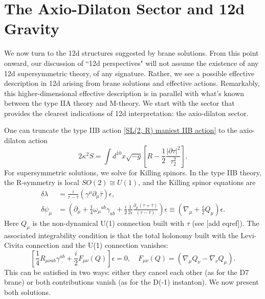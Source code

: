 \section{The Axio-Dilaton Sector and 12d Gravity}
We now turn to the 12d structures suggested by brane solutions.
From this point onward, our discussion of ``12d perspectives" will not assume the existence of any 12d supersymmetric theory, of any signature.
Rather, we see a possible effective description in 12d arising from brane solutions and effective actions.
Remarkably, this higher-dimensional effective description is in parallel with what's known between the type IIA theory and M-theory.
We start with the sector that provides the clearest indications of 12d interpretation: the axio-dilaton sector.

One can truncate the type IIB action \eqref{SL(2, R) maniest IIB action} to the axio-dilaton action
\begin{equation}
2\kappa^2S=
\int d^{10}x\sqrt{-g}\left[
R-\frac{1}{2}\frac{|\partial \tau|^2}{\tau_2^2}
\right].
\label{IIB axio-dilaton action}
\end{equation}
For supersymmetric solutions, we solve for Killing spinors.
In the type IIB theory, the R-symmetry is local $SO(2)\cong U(1)$, and the Killing spinor equations are \cite{Bergshoeff:2006jj}
\begin{equation}
\begin{aligned}
\delta\lambda
&=\frac{i}{\tau-\bar\tau}(\gamma^\mu\partial_\mu \bar\tau)\epsilon,\\
\delta\psi_\mu
&=
\left(
\partial_\mu+\frac{1}{4}\omega_\mu{}^{ab}\gamma_{ab} +\frac{i}{2}\frac{1}{2i}\frac{\partial_\mu(\tau+\bar\tau)}{(\tau-\bar\tau)}
\right)\epsilon
\equiv\left(\nabla_\mu+\frac{i}{2}Q_\mu\right)\epsilon.
\end{aligned}
\label{9+1 IIB axio-dilaton Killing spinor equations}
\end{equation}
Here $Q_\mu$ is the non-dynamical U(1) connection built with $\tau$ (see [add eqref]). 
The associated integrability condition is that the total holonomy built with the Levi-Civita connection and the U(1) connection vanishes:
\begin{equation}
\left[\frac{1}{4}R_{\mu\nu ab}\gamma^{ab}
+ \frac{i}{2}F_{\mu\nu}(Q)\right]
\epsilon = 0,\quad
F_{\mu\nu}(Q)=(\nabla_\mu Q_\nu-\nabla_\nu Q_\mu).
\end{equation}
This can be satisfied in two ways: either they cancel each other (as for the D7 brane) or both contributions vanish (as for the D(-1) instanton).
We now present both solutions.

